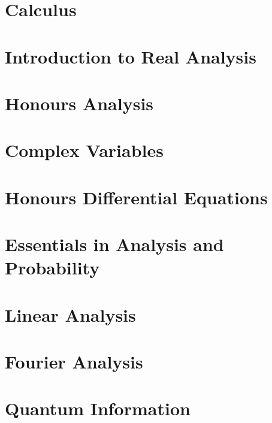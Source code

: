 \documentclass[12pt]{report}
\begin{document}
\chapter{Calculus}\label{cha:calculus}

\chapter{Introduction to Real Analysis}\label{cha:intr-real-analys}

\chapter{Honours Analysis}\label{cha:honours-analysis}

\chapter{Complex Variables}\label{cha:complex-variables}

\chapter{Honours Differential Equations}\label{cha:hono-diff-equat}

\chapter{Essentials in Analysis and Probability\label{cha:essent-analys-prob}}

\chapter{Linear Analysis}\label{cha:linear-analysis}

\chapter{Fourier Analysis}\label{cha:fourier-analysis}

\chapter{Quantum Information}\label{cha:quantum-information}
\end{document}
